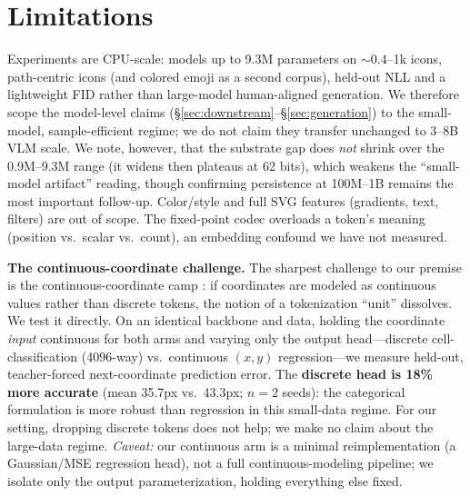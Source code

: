 \documentclass[11pt]{article}
\begin{document}
\section*{Limitations}
Experiments are CPU-scale: models up to 9.3M parameters on ${\sim}0.4$--1k icons, path-centric icons (and colored emoji as a second corpus), held-out NLL and a lightweight FID rather than large-model human-aligned generation. We therefore scope the model-level claims (\S\ref{sec:downstream}--\S\ref{sec:generation}) to the small-model, sample-efficient regime; we do not claim they transfer unchanged to 3--8B VLM scale. We note, however, that the substrate gap does \emph{not} shrink over the 0.9M--9.3M range (it widens then plateaus at 62 bits), which weakens the ``small-model artifact'' reading, though confirming persistence at 100M--1B remains the most important follow-up. Color/style and full SVG features (gradients, text, filters) are out of scope. The fixed-point codec overloads a token's meaning (position vs.\ scalar vs.\ count), an embedding confound we have not measured.

\textbf{The continuous-coordinate challenge.} The sharpest challenge to our premise is the continuous-coordinate camp \citep{ogezi2026cnm}: if coordinates are modeled as continuous values rather than discrete tokens, the notion of a tokenization ``unit'' dissolves. We test it directly. On an identical backbone and data, holding the coordinate \emph{input} continuous for both arms and varying only the output head---discrete cell-classification (4096-way) vs.\ continuous $(x,y)$ regression---we measure held-out, teacher-forced next-coordinate prediction error. The \textbf{discrete head is 18\% more accurate} (mean 35.7px vs.\ 43.3px; $n{=}2$ seeds): the categorical formulation is more robust than regression in this small-data regime. For our setting, dropping discrete tokens does not help; we make no claim about the large-data regime. \emph{Caveat:} our continuous arm is a minimal reimplementation (a Gaussian/MSE regression head), not a full continuous-modeling pipeline; we isolate only the output parameterization, holding everything else fixed.




\appendix
\end{document}
